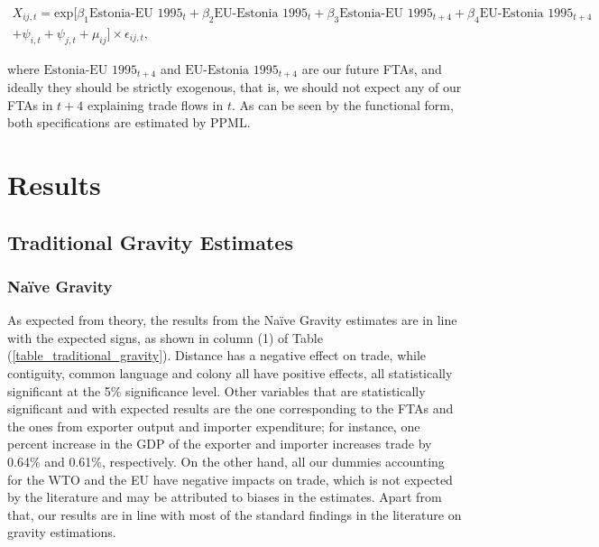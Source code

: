 \documentclass[a4paper,10pt]{article}
\begin{document}
\vspace{-0.5cm}

\begin{multline*}
	X_{ij,t} = \text{exp} [\beta_{1} \text{Estonia-EU 1995}_{t} + \beta_{2} \text{EU-Estonia 1995}_{t} + \beta_{3} \text{Estonia-EU 1995}_{t+4} + \beta_{4} \text{EU-Estonia 1995}_{t+4} \\
	+ \psi_{i,t} + \psi_{j,t} + \mu_{ij}] \times \epsilon_{ij,t},
\end{multline*}

\noindent where $\text{Estonia-EU 1995}_{t+4}$ and $\text{EU-Estonia 1995}_{t+4}$ are our future FTAs, and ideally they should be strictly exogenous, that is, we should not expect any of our FTAs in $t+4$ explaining trade flows in $t$. As can be seen by the functional form, both specifications are estimated by PPML.

\section{Results} \label{results}

\subsection{Traditional Gravity Estimates} \label{results_traditional}

\subsubsection{Naïve Gravity} \label{results_traditional_naive}

As expected from theory, the results from the Naïve Gravity estimates are in line with the expected signs, as shown in column (1) of Table (\ref{table_traditional_gravity}). Distance has a negative effect on trade, while contiguity, common language and colony all have positive effects, all statistically significant at the 5\% significance level. Other variables that are statistically significant and with expected results are the one corresponding to the FTAs and the ones from exporter output and importer expenditure; for instance, one percent increase in the GDP of the exporter and importer increases trade by 0.64\% and 0.61\%, respectively. On the other hand, all our dummies accounting for the WTO and the EU have negative impacts on trade, which is not expected by the literature and may be attributed to biases in the estimates. Apart from that, our results are in line with most of the standard findings in the literature on gravity estimations.
\end{document}

